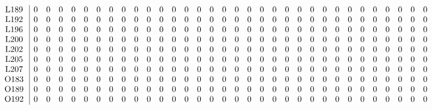 \begin{table}[H]
\begin{center}
\begin{math}
\begin{array}{c|cccccccccccccccccccccccccccccccc}
\mathrm{L189} \hspace*{2pt} &  0 &  0 &  0 &  0 &  0 &  0 &  0 &  0 &  0 &  0 &  0 &  0 &  0 &  0 &  0 &  0 &  0 &  0 &  0 &  0 &  0 &  0 &  0 &  0 &  0 &  0 &  0 &  0 &  0 &  0 &  0 &  0 \\
\mathrm{L192} \hspace*{2pt} &  0 &  0 &  0 &  0 &  0 &  0 &  0 &  0 &  0 &  0 &  0 &  0 &  0 &  0 &  0 &  0 &  0 &  0 &  0 &  0 &  0 &  0 &  0 &  0 &  0 &  0 &  0 &  0 &  0 &  0 &  0 &  0 \\
\mathrm{L196} \hspace*{2pt} &  0 &  0 &  0 &  0 &  0 &  0 &  0 &  0 &  0 &  0 &  0 &  0 &  0 &  0 &  0 &  0 &  0 &  0 &  0 &  0 &  0 &  0 &  0 &  0 &  0 &  0 &  0 &  0 &  0 &  0 &  0 &  0 \\
\mathrm{L200} \hspace*{2pt} &  0 &  0 &  0 &  0 &  0 &  0 &  0 &  0 &  0 &  0 &  0 &  0 &  0 &  0 &  0 &  0 &  0 &  0 &  0 &  0 &  0 &  0 &  0 &  0 &  0 &  0 &  0 &  0 &  0 &  0 &  0 &  0 \\
\mathrm{L202} \hspace*{2pt} &  0 &  0 &  0 &  0 &  0 &  0 &  0 &  0 &  0 &  0 &  0 &  0 &  0 &  0 &  0 &  0 &  0 &  0 &  0 &  0 &  0 &  0 &  0 &  0 &  0 &  0 &  0 &  0 &  0 &  0 &  0 &  0 \\
\mathrm{L205} \hspace*{2pt} &  0 &  0 &  0 &  0 &  0 &  0 &  0 &  0 &  0 &  0 &  0 &  0 &  0 &  0 &  0 &  0 &  0 &  0 &  0 &  0 &  0 &  0 &  0 &  0 &  0 &  0 &  0 &  0 &  0 &  0 &  0 &  0 \\
\mathrm{L207} \hspace*{2pt} &  0 &  0 &  0 &  0 &  0 &  0 &  0 &  0 &  0 &  0 &  0 &  0 &  0 &  0 &  0 &  0 &  0 &  0 &  0 &  0 &  0 &  0 &  0 &  0 &  0 &  0 &  0 &  0 &  0 &  0 &  0 &  0 \\
\mathrm{O183} \hspace*{2pt} &  0 &  0 &  0 &  0 &  0 &  0 &  0 &  0 &  0 &  0 &  0 &  0 &  0 &  0 &  0 &  0 &  0 &  0 &  0 &  0 &  0 &  0 &  0 &  0 &  0 &  0 &  0 &  0 &  0 &  0 &  0 &  0 \\
\mathrm{O189} \hspace*{2pt} &  0 &  0 &  0 &  0 &  0 &  0 &  0 &  0 &  0 &  0 &  0 &  0 &  0 &  0 &  0 &  0 &  0 &  0 &  0 &  0 &  0 &  0 &  0 &  0 &  0 &  0 &  0 &  0 &  0 &  0 &  0 &  0 \\
\mathrm{O192} \hspace*{2pt} &  0 &  0 &  0 &  0 &  0 &  0 &  0 &  0 &  0 &  0 &  0 &  0 &  0 &  0 &  0 &  0 &  0 &  0 &  0 &  0 &  0 &  0 &  0 &  0 &  0 &  0 &  0 &  0 &  0 &  0 &  0 &  0 \\

\end{array}
\end{math}
\end{center}
\end{table}

